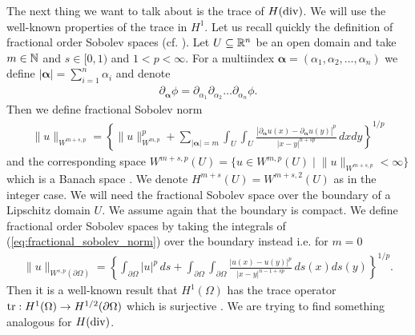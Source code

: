 \documentclass[../master_thesis.tex]{subfiles}
\begin{document}
The next thing we want to talk about is the trace of $H(\operatorname{div})$. 
We will use the well-known properties of the trace in $H^1$. 
Let us recall 
quickly the definition of fractional order Sobolev spaces (cf. \cite{}). Let 
$U \subseteq \mathbb{R}^n$ be an open domain and take $m \in \mathbb{N}$ and 
$s \in [0, 1)$ and $1 < p < \infty$. For a multiindex $\boldsymbol{\alpha} = 
(\alpha_1, \alpha_2, ..., \alpha_n)$ we define $|\boldsymbol{\alpha}| = \sum_{i=1}^n \alpha_i$ 
and denote 
\begin{align}
    \partial_{\bm{\alpha}} \phi = 
    \partial_{\alpha_1} \partial_{\alpha_2} \dots \partial_{\alpha_n} \phi.
\end{align}
Then we define fractional Sobolev norm
\begin{align}
    \lVert u \rVert _ {W^{m+s, p}} = \left\{ \lVert u \rVert ^p_{W^{m, p}} + 
        \sum_{|\bm{\alpha}|=m} \int_U \int_U 
        \frac{|\partial_{\bm{\alpha}} u(x) - \partial_{\bm{\alpha}} u(y)|^p}
        {|x - y|^{n+sp}} \, dx dy\right\}^{1/p}\label{eq:fractional_sobolev_norm}
\end{align}
and the corresponding space $W^{m+s, p}(U) = \{ u \in W^{m,p}(U) \mid \lVert u \rVert _{W^{m+s, p}} < \infty \}$ 
which is a Banach space \cite[p.42]{monk}. We denote 
$H^{m+s}(U) = W^{m+s, 2}(U)$ as in the integer case. We will need the 
fractional Sobolev space over the boundary of a Lipschitz domain $U$. We assume 
again that the boundary is compact.
We define fractional order Sobolev spaces by taking the integrals of (\ref{eq:fractional_sobolev_norm}) 
over the boundary instead i.e. for $m = 0$
\begin{align*}
    \lVert u \rVert _{W^{s, p}(\partial \Omega)} = \left\{ \int_{\partial\Omega} |u|^p \, ds + 
        \int_{\partial\Omega} \int_{\partial\Omega}
        \frac{|u(x) - u(y)|^p}
        {|x - y|^{n-1+sp}} \, ds(x) ds(y)\right\}^{1/p}.
\end{align*}
Then it 
is a well-known result that $H^1(\Omega)$ has the trace operator 
$\operatorname{tr}: H^1(\Omega) \rightarrow H^{1/2}(\partial \Omega)$ which is surjective \cite[p.28]{arnold}.
We are trying to find something analogous for $H(\operatorname{div})$.
\end{document}
